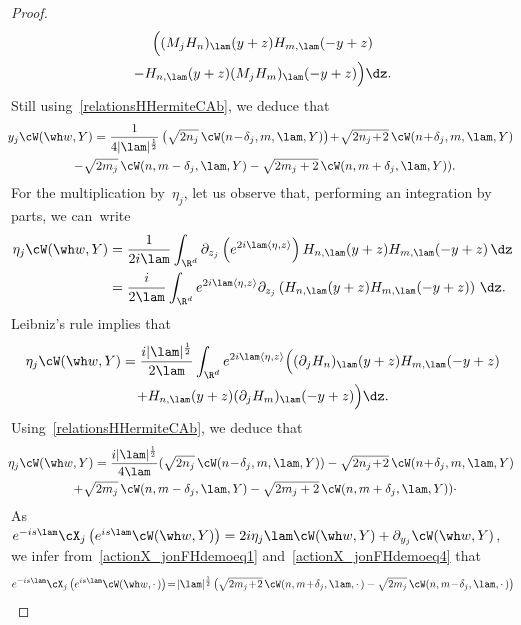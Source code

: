 \begin{proof}
\begin{multline*}
\Big((M_jH_n)_\lam (y+z) H_{m,\lam}(-y+z)\\
- H_{n,\lam}(y+z) (M_jH_m)_\lam(-y+z)\Big)\dz.
\end{multline*}
Still using~\eqref{relationsHHermiteCAb}, we deduce that
\begin{multline}\label{actionX_jonFHdemoeq3}
\!\! y_j \cW(\wh w,Y) = \frac 1 {4|\lam|^{\frac 12} } \left(\sqrt {2n_j} \,\cW(n\!-\!\delta_j,m,\lam,Y) \right)\!+\!\sqrt {2n_j\!+\!2}\,\cW(n\!+\!\delta_j,m,\lam,Y) \\
-\sqrt {2m_j}\,\cW(n,m-\delta_j,\lam,Y) -\sqrt {2m_j+2}\,\cW(n,m+\delta_j,\lam,Y)).\!\!
\end{multline}
For the multiplication by~$\eta_j$, let us observe that, performing an integration by parts, we can~write
\[
\begin{aligned}
\eta_j\cW(\wh w,Y) & = \frac 1 {2i\lam} \int_{\R^d} \partial_{z_j} \left(e^{2i\lam\langle \eta,z\rangle} \right) H_{n,\lam} (y+z) H_{m,\lam}(-y+z)\, \dz\\
& = \frac i {2\lam} \int_{\R^d} e^{2i\lam\langle \eta,z\rangle}\partial_{z_j} \left(H_{n,\lam} (y+z) H_{m,\lam}(-y+z) \right)\,\dz.
\end{aligned}
\]
Leibniz's rule implies that
\begin{multline*}
\eta_j\cW(\wh w,Y) = \frac {i|\lam|^{\frac 12}} {2\lam} \int_{\R^d} e^{2i\lam\langle \eta,z\rangle} \Big((\partial_jH_{n})_\lam (y+z) H_{m,\lam}(-y+z) \\
+ H_{n,\lam} (y+z) (\partial_j H_m)_\lam (-y+z) \Big)\dz.
\end{multline*}
Using~\eqref{relationsHHermiteCAb}, we deduce that
\begin{multline}\label{actionX_jonFHdemoeq4}
\!\!\eta_j \cW(\wh w,Y) = \frac {i |\lam|^{\frac 12} } {4\lam} (\sqrt {2n_j} \,\cW(n\!-\!\delta_j,m,\lam,Y)) -\sqrt {2n_j\!+\!2}\, \cW(n\!+\!\delta_j,m,\lam,Y) \\
+\sqrt {2m_j}\,\cW(n,m-\delta_j,\lam,Y) -\sqrt {2m_j+2}\,\cW(n,m+\delta_j,\lam,Y))\cdotp\!\!
\end{multline}
As~$e^{-is\lam} \cX_j\left(e^{is\lam}\cW(\wh w,Y) \right) = 2i\eta_j \lam\cW(\wh w,Y) +\partial_{y_j} \cW(\wh w,Y)$, we infer from~\eqref{actionX_jonFHdemoeq1} and~\eqref{actionX_jonFHdemoeq4} that
\[
\begin{aligned}
e^{-is\lam} \cX_j\left(e^{is\lam}\cW(\wh w,{\cdot\,}) \right) &\! =\! |\lam|^{\frac 12} \left(\sqrt {2m_j\!+\!2}\,\cW(n,m\!+\!\delta_j,\lam,{\cdot\,})-\sqrt {2m_j}\,\cW(n,m\!-\!\delta_j,\lam,{\cdot\,})\right)\\

\end{aligned}\]
\end{proof}
